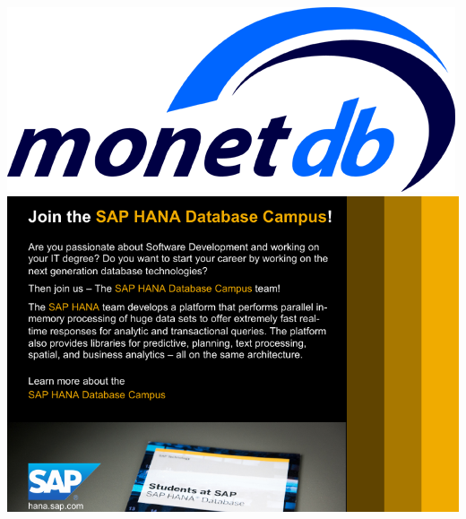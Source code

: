 \includegraphics[height=.49\textheight,width=\textwidth,keepaspectratio]{ads/monetdb.png}
\vfill
\includegraphics[height=.49\textheight,width=\textwidth,keepaspectratio]{ads/sap.pdf}
\pagebreak

